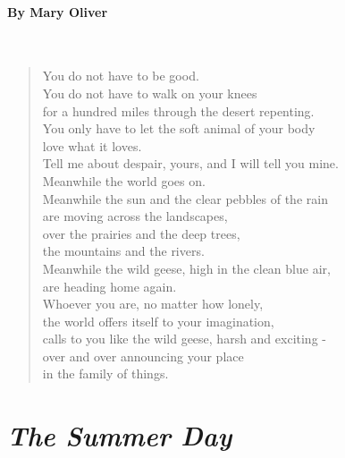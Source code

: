 \documentclass[11pt, letterpaper]{memoir}
\begin{document}
{\begin{minipage}[t]{0.6\linewidth}
\paragraph{By Mary Oliver}~
\begin{verse}
	You do not have to be good.\\
	You do not have to walk on your knees\\
	for a hundred miles through the desert repenting.\\
	You only have to let the soft animal of your body\\
	love what it loves.\\
	Tell me about despair, yours, and I will tell you mine.\\
	Meanwhile the world goes on.\\
	Meanwhile the sun and the clear pebbles of the rain\\
	are moving across the landscapes,\\
	over the prairies and the deep trees,\\
	the mountains and the rivers.\\
	Meanwhile the wild geese, high in the clean blue air,\\
	are heading home again.\\
	Whoever you are, no matter how lonely,\\
	the world offers itself to your imagination,\\
	calls to you like the wild geese, harsh and exciting -\\
	over and over announcing your place\\
	in the family of things.
\end{verse}
\end{minipage}
\section*{\emph{The Summer Day}}
}
\end{document}

